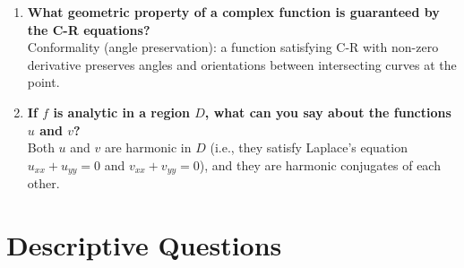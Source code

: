 \documentclass[12pt,a4paper]{article}
\begin{document}
\begin{enumerate}
  \item \textbf{What geometric property of a complex function is guaranteed by the C-R equations?}\\
  Conformality (angle preservation): a function satisfying C-R with non-zero derivative preserves angles and orientations between intersecting curves at the point.

  \item \textbf{If $f$ is analytic in a region $D$, what can you say about the functions $u$ and $v$?}\\
  Both $u$ and $v$ are harmonic in $D$ (i.e., they satisfy Laplace's equation $u_{xx}+u_{yy}=0$ and $v_{xx}+v_{yy}=0$), and they are harmonic conjugates of each other.
\end{enumerate}

\section{Descriptive Questions}
\end{document}
